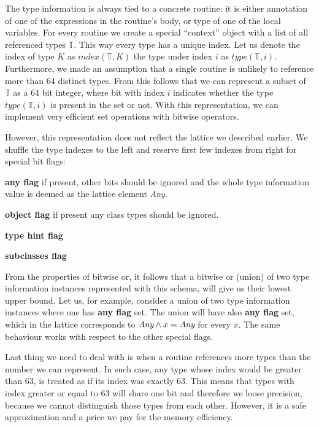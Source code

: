         The type information is always tied to a concrete routine: 
        it is either annotation of one of the expressions in 
        the routine's body, or type of one of the local variables. 
        For every routine we create a special ``context'' object 
        with a list of all referenced types $\mathbb{T}$. This way 
        every type has a unique index. Let us denote the index 
        of type $K$ as $\mathit{index}(\mathbb{T}, K)$ the 
        type under index $i$ as $\mathit{type}(\mathbb{T}, i)$.
        Furthermore, we made an assumption that a single routine 
        is unlikely to reference more than $64$ distinct types. 
        From this follows that we can represent a subset of 
        $\mathbb{T}$ as a 64 bit integer, where bit with index 
        $i$ indicates whether the type $\mathit{type}(\mathbb{T}, i)$ 
        is present in the set or not. With this representation, 
        we can implement very efficient set operations with 
        bitwise operators.
        
        However, this representation does not reflect the 
        lattice we described earlier. We shuffle 
        the type indexes to the left and reserve first few 
        indexes from right for special bit flags:
        
        \begin{itemize*}
            \item\textbf{any flag} if present, other bits should be ignored and the whole 
                type information value is deemed as the lattice element \emph{Any}.            
            \item\textbf{object flag} if present any class types should be ignored.
            \item\textbf{type hint flag}
            \item\textbf{subclasses flag}
        \end{itemize*}
        
        From the properties of bitwise or, it follows that 
        a bitwise or (union) of two type information instances 
        represented with this schema, will give us their 
        lowest upper bound. Let us, for example, consider 
        a union of two type information instances where one 
        has \textbf{any flag} set. The union will have 
        also \textbf{any flag} set, which in the lattice 
        corresponds to $\emph{Any}\wedge{}x=\emph{Any}$ 
        for every $x$. The same behaviour works with 
        respect to the other special flags.
        
        Last thing we need to deal with is when a routine references 
        more types than the number we can represent. In such case, 
        any type whose index would be greater than $63$, is treated as 
        if its index was exactly $63$. This means that types with 
        index greater or equal to $63$ will share one bit and 
        therefore we loose precision, because we cannot distinguish those 
        types from each other. However, it is a safe approximation and 
        a price we pay for the memory efficiency.

